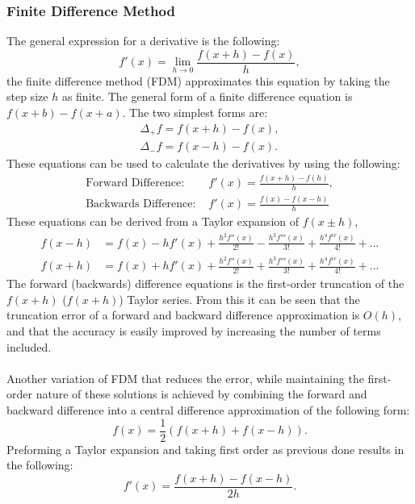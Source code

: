 \documentclass[12pt]{ociamthesis}
\begin{document}
\subsubsection{Finite Difference Method}
The general expression for a derivative is the following:
\begin{equation}
f'(x)=\lim\limits _{h\to0}\frac{f(x+h)-f(x)}{h} , 
\end{equation}
the finite difference method (FDM) approximates this equation by taking the step size $h$ as finite. The general form of a finite difference equation is $f(x+b)-f(x+a)$. The two simplest forms are:
\begin{align}
\Delta_+ f =  f(x+h)-f(x), \\
\Delta_- f = f(x-h)-f(x) .
\end{align}
These equations can be used to calculate the derivatives by using the following:
\begin{align}
\text{Forward Difference: }&f'(x) = \frac{f(x+h)-f(h)}{h} , \\
\text{Backwards Difference: }&f'(x) = \frac{f(x)-f(x-h)}{h}
\end{align}
These equations can be derived from a Taylor expansion of $f(x\pm h)$,
\begin{align}
f(x-h) & = f(x)-h f'(x)+\frac{h^{2}f''(x)}{2!}-\frac{h^{3}f'''(x)}{3!}+\frac{h^{4}f^{iv}(x)}{4!}+...\label{eq:TaylorForward}\\
f(x+h) & = f(x)+h f'(x)+\frac{h^{2}f''(x)}{2!}+\frac{h^{3}f'''(x)}{3!}+\frac{h^{4}f^{iv}(x)}{4!}+...\label{eq:TaylorBackward}
\end{align}
The forward (backwards) difference equations is the first-order truncation of the $f(x+h)$ ($f(x+h)$) Taylor series. From this it can be seen that the truncation error of a forward and backward difference approximation is $O(h)$, and that the accuracy is easily improved by increasing the number of terms included. \\ \\
Another variation of FDM that reduces the error, while maintaining the first-order nature of these solutions is achieved by combining the forward and backward difference into a central difference approximation of the following form: 
\begin{equation}
f(x)=\frac{1}{2} \left(f(x + h) + f(x - h)\right).
\end{equation}
Preforming a Taylor expansion and taking first order as previous done results in the following: 
\begin{equation}
f'(x)=\frac{f(x+h)-f(x-h)}{2h}.\label{eq:First Order CD}
\end{equation}
\end{document}

